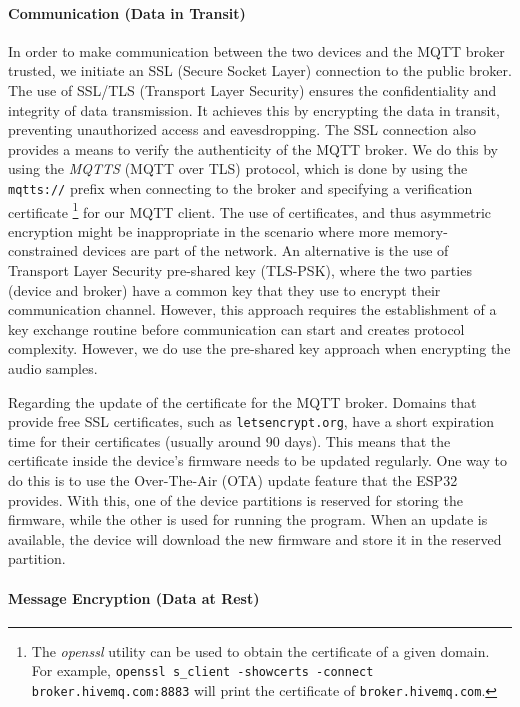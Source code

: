 \documentclass[conference]{IEEEtran}
\begin{document}
\paragraph{Communication (Data in Transit)}

In order to make communication between the two devices and the MQTT broker
trusted, we initiate an SSL (Secure Socket Layer) connection to the public broker. 
The use of SSL/TLS (Transport Layer Security)
ensures the confidentiality and integrity of data transmission. 
It achieves this by encrypting the data in transit, preventing
unauthorized access and eavesdropping. The SSL connection also provides a means
to verify the authenticity of the MQTT broker.
We do this by using the \textit{MQTTS} (MQTT over TLS) protocol, which is done 
by using the \texttt{mqtts://} prefix when connecting to the broker and specifying 
a verification certificate
\footnote{The \textit{openssl} utility can be used to obtain the certificate of a given domain.
For example, \texttt{openssl s\_client -showcerts -connect broker.hivemq.com:8883} will print the certificate of \texttt{broker.hivemq.com}.}
for our MQTT client.
The use of certificates, and thus asymmetric encryption might be inappropriate in the scenario where more 
memory-constrained devices are part of the network. 
An alternative is the use of Transport Layer Security pre-shared key (TLS-PSK)\cite{rfc4279}, where the two parties 
(device and broker) have a common key that they use to encrypt their communication channel.
However, this approach requires the establishment of a key exchange routine before communication can start
and creates protocol complexity.
However, we do use the pre-shared key approach when encrypting the audio samples.

Regarding the update of the certificate for the MQTT broker.
Domains that provide free SSL certificates, such as \texttt{letsencrypt.org}, have a short expiration time for their certificates (usually around 90 days).
This means that the certificate inside the device's firmware needs to be updated regularly.
One way to do this is to use the Over-The-Air (OTA) update feature that the ESP32 provides.
With this, one of the device partitions is reserved for storing the firmware, while the other is used for running the program.
When an update is available, the device will download the new firmware and store it in the reserved partition.

\paragraph{Message Encryption (Data at Rest)}
\label{par:message_encryption}
\end{document}
